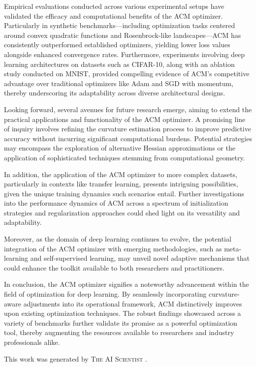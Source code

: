 \documentclass{article} %
\begin{document}
Empirical evaluations conducted across various experimental setups have validated the efficacy and computational benefits of the ACM optimizer. Particularly in synthetic benchmarks—including optimization tasks centered around convex quadratic functions and Rosenbrock-like landscapes—ACM has consistently outperformed established optimizers, yielding lower loss values alongside enhanced convergence rates. Furthermore, experiments involving deep learning architectures on datasets such as CIFAR-10, along with an ablation study conducted on MNIST, provided compelling evidence of ACM's competitive advantage over traditional optimizers like Adam and SGD with momentum, thereby underscoring its adaptability across diverse architectural designs.

Looking forward, several avenues for future research emerge, aiming to extend the practical applications and functionality of the ACM optimizer. A promising line of inquiry involves refining the curvature estimation process to improve predictive accuracy without incurring significant computational burdens. Potential strategies may encompass the exploration of alternative Hessian approximations or the application of sophisticated techniques stemming from computational geometry.

In addition, the application of the ACM optimizer to more complex datasets, particularly in contexts like transfer learning, presents intriguing possibilities, given the unique training dynamics such scenarios entail. Further investigations into the performance dynamics of ACM across a spectrum of initialization strategies and regularization approaches could shed light on its versatility and adaptability.

Moreover, as the domain of deep learning continues to evolve, the potential integration of the ACM optimizer with emerging methodologies, such as meta-learning and self-supervised learning, may unveil novel adaptive mechanisms that could enhance the toolkit available to both researchers and practitioners.

In conclusion, the ACM optimizer signifies a noteworthy advancement within the field of optimization for deep learning. By seamlessly incorporating curvature-aware adjustments into its operational framework, ACM distinctively improves upon existing optimization techniques. The robust findings showcased across a variety of benchmarks further validate its promise as a powerful optimization tool, thereby augmenting the resources available to researchers and industry professionals alike.

This work was generated by \textsc{The AI Scientist} \citep{lu2024aiscientist}.



\end{document}
